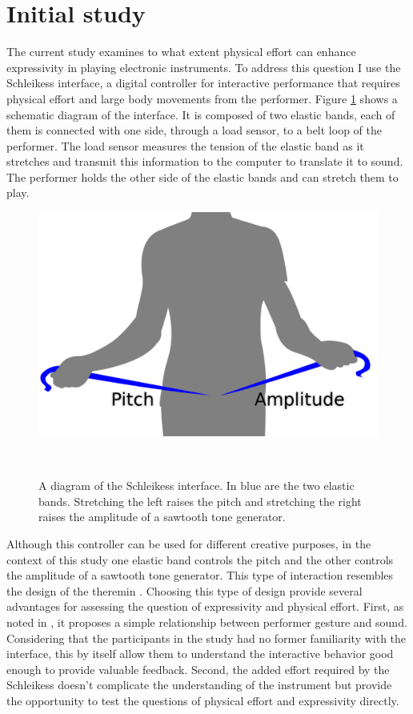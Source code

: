 \documentclass{sigchi}
\begin{document}
\section{Initial study}

The current study examines to what extent physical effort can enhance expressivity in playing electronic instruments.
To address this question I use the Schleikess interface, a digital controller for interactive performance that requires physical effort and large body movements from the performer.
Figure \ref{fig:schleikess} shows a schematic diagram of the interface.
It is composed of two elastic bands, each of them is connected with one side, through a load sensor, to a belt loop of the performer.
The load sensor measures the tension of the elastic band as it stretches and transmit this information to the computer to translate it to sound.
The performer holds the other side of the elastic bands and can stretch them to play.

\begin{figure}
  \centering
  \includegraphics[width=0.9\columnwidth]{figures/schleikess}
  \caption{A diagram of the Schleikess interface. In blue are the two elastic bands. Stretching the left raises the pitch and stretching the right raises the amplitude of a sawtooth tone generator.}~\label{fig:schleikess}
\end{figure}

Although this controller can be used for different creative purposes, in the context of this study one elastic band controls the pitch and the other controls the amplitude of a sawtooth tone generator.
This type of interaction resembles the design of the theremin \cite{Theremin1996}.
Choosing this type of design provide several advantages for assessing the question of expressivity and physical effort.
First, as noted in \cite{Fyans2010}, it proposes a simple relationship between performer gesture and sound.
Considering that the participants in the study had no former familiarity with the interface, this by itself allow them to understand the interactive behavior good enough to provide valuable feedback.
Second, the added effort required by the Schleikess doesn't complicate the understanding of the instrument but provide the opportunity to test the questions of physical effort and expressivity directly.
\end{document}
